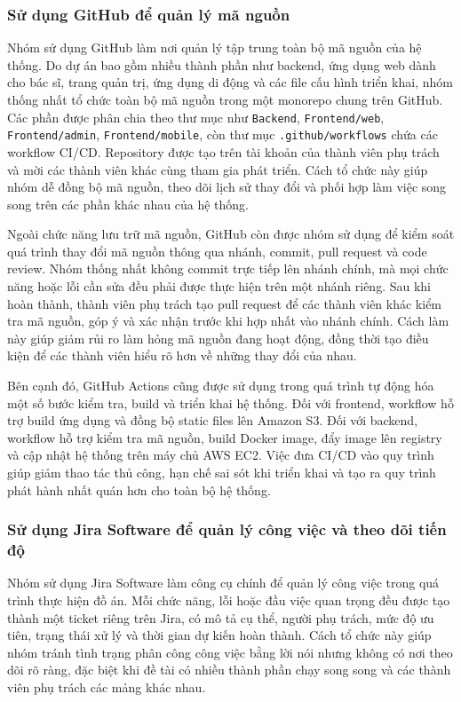 \subsubsection{Sử dụng GitHub để quản lý mã nguồn}
\par Nhóm sử dụng GitHub làm nơi quản lý tập trung toàn bộ mã nguồn của hệ thống. Do dự án bao gồm nhiều thành phần như backend, ứng dụng web dành cho bác sĩ, trang quản trị, ứng dụng di động và các file cấu hình triển khai, nhóm thống nhất tổ chức toàn bộ mã nguồn trong một monorepo chung trên GitHub. Các phần được phân chia theo thư mục như \texttt{Backend}, \texttt{Frontend/web}, \texttt{Frontend/admin}, \texttt{Frontend/mobile}, còn thư mục \texttt{.github/workflows} chứa các workflow CI/CD. Repository được tạo trên tài khoản của thành viên phụ trách và mời các thành viên khác cùng tham gia phát triển. Cách tổ chức này giúp nhóm dễ đồng bộ mã nguồn, theo dõi lịch sử thay đổi và phối hợp làm việc song song trên các phần khác nhau của hệ thống.

\par Ngoài chức năng lưu trữ mã nguồn, GitHub còn được nhóm sử dụng để kiểm soát quá trình thay đổi mã nguồn thông qua nhánh, commit, pull request và code review. Nhóm thống nhất không commit trực tiếp lên nhánh chính, mà mọi chức năng hoặc lỗi cần sửa đều phải được thực hiện trên một nhánh riêng. Sau khi hoàn thành, thành viên phụ trách tạo pull request để các thành viên khác kiểm tra mã nguồn, góp ý và xác nhận trước khi hợp nhất vào nhánh chính. Cách làm này giúp giảm rủi ro làm hỏng mã nguồn đang hoạt động, đồng thời tạo điều kiện để các thành viên hiểu rõ hơn về những thay đổi của nhau.

\par Bên cạnh đó, GitHub Actions cũng được sử dụng trong quá trình tự động hóa một số bước kiểm tra, build và triển khai hệ thống. Đối với frontend, workflow hỗ trợ build ứng dụng và đồng bộ static files lên Amazon S3. Đối với backend, workflow hỗ trợ kiểm tra mã nguồn, build Docker image, đẩy image lên registry và cập nhật hệ thống trên máy chủ AWS EC2. Việc đưa CI/CD vào quy trình giúp giảm thao tác thủ công, hạn chế sai sót khi triển khai và tạo ra quy trình phát hành nhất quán hơn cho toàn bộ hệ thống.

\subsubsection{Sử dụng Jira Software để quản lý công việc và theo dõi tiến độ}
\par Nhóm sử dụng Jira Software làm công cụ chính để quản lý công việc trong quá trình thực hiện đồ án. Mỗi chức năng, lỗi hoặc đầu việc quan trọng đều được tạo thành một ticket riêng trên Jira, có mô tả cụ thể, người phụ trách, mức độ ưu tiên, trạng thái xử lý và thời gian dự kiến hoàn thành. Cách tổ chức này giúp nhóm tránh tình trạng phân công công việc bằng lời nói nhưng không có nơi theo dõi rõ ràng, đặc biệt khi đề tài có nhiều thành phần chạy song song và các thành viên phụ trách các mảng khác nhau.


